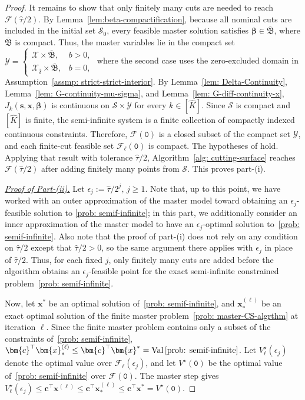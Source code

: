 \documentclass[opre,sglanonrev]{informs4}
\newcommand{\mF}{\mathcal{F}}
\newcommand{\mS}{\mathcal{S}}
\newcommand{\mX}{\mathcal{X}}
\newcommand{\bbeta}{\bm{\beta}}
\newcommand{\bc}{\bm{c}}
\newcommand{\bs}{\bm{s}}
\newcommand{\bx}{\bm{x}}
\newcommand{\Val}{\operatorname{Val}}
\begin{document}
{\begin{proof}
It remains to show that only finitely many cuts are needed to reach
\(\mF(\hat{\tau}/2)\). By Lemma~\ref{lem:beta-compactification}, because all
nominal cuts are included in the initial set \(\mS_0\), every feasible master
solution satisfies \(\bbeta\in\overline{\mathfrak B}\), where
\(\overline{\mathfrak B}\) is compact. Thus, the master variables lie in the compact set \(\mathcal Y=
\begin{cases}
\mX\times\overline{\mathfrak B}, & b>0,\\[2pt]
\mX_{\hat\delta}\times\overline{\mathfrak B}, & b=0,
\end{cases}\)
where the second case uses the zero-excluded domain in
Assumption~\ref{assmp: strict-strict-interior}. By
Lemma~\ref{lem: Delta-Continuity}, Lemma~\ref{lem: G-continuity-mu-sigma}, and
Lemma~\ref{lem: G-diff-continuity-x}, \(J_k(\bs,\bx,\bbeta)\) is continuous on
\(\mS\times\mathcal Y\) for every \(k\in[\hat K]\). Since \(\mS\) is compact
and \([\hat K]\) is finite, the semi-infinite system is a finite collection of
compactly indexed continuous constraints. Therefore, \(\mF(\mathtt{0})\) is a
closed subset of the compact set \(\mathcal Y\), and each finite-cut feasible
set \(\mF_\ell(\mathtt{0})\) is compact. The hypotheses of
\cite[Theorem~7.2]{hettich1993semi} hold. Applying that result with tolerance
\(\hat{\tau}/2\), Algorithm~\ref{alg: cutting-surface} reaches
\(\mF(\hat{\tau}/2)\) after adding finitely many points from \(\mS\). This proves part-(i).

\emph{\underline{Proof of Part-(ii).}} 
Let \(\epsilon_j:=\hat{\tau}/2^j, \, j\geq 1\). Note that, up to this point, we have worked with an outer approximation of the master model toward obtaining an \(\epsilon_j\)-feasible solution to \eqref{prob: semif-infinite}; in this part, we additionally consider an inner approximation of the master model to have an \(\epsilon_j\)-optimal solution to~\eqref{prob: semif-infinite}.  Also note that the proof of part-(i) does not rely on any condition on \(\hat{\tau}/2\) except that \(\hat{\tau}/2 > 0\), so the same argument there applies
with \(\epsilon_j\) in place of \(\hat{\tau}/2\). Thus, for each fixed \(j\),
only finitely many cuts are added before the algorithm obtains an
\(\epsilon_j\)-feasible point for the exact semi-infinite constrained problem~\eqref{prob: semif-infinite}.

Now, let \(\bx^*\) be an optimal solution of~\eqref{prob: semif-infinite}, and
\(\bx_*^{(\ell)}\) be an exact optimal solution of the finite master problem~\eqref{prob: master-CS-algrthm} at
iteration \(\ell\). Since the finite master problem contains only a subset of
the constraints of~\eqref{prob: semif-infinite},
\(\bc^\top\bx_*^{(\ell)}\le \bc^\top\bx^*=\Val\eqref{prob: semif-infinite}\).
Let \(V_\ell^\star(\epsilon_j)\) denote the optimal value over
\(\mF_\ell(\epsilon_j)\), and let \(V^\star(\mathtt{0})\) be the optimal value
of~\eqref{prob: semif-infinite} over $\mF(\mathtt{0})$. The master step gives
\(V_\ell^\star(\epsilon_j)\le
\bc^\top\bx^{(\ell)}\le
\bc^\top\bx_*^{(\ell)}
\le
\bc^\top\bx^*=V^\star(\mathtt{0})\).


\end{proof}}
\end{document}

